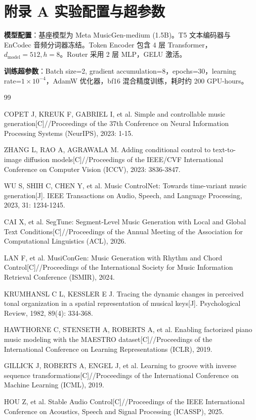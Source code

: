 \documentclass[twocolumn, a4paper, 10pt]{ctexart}
\begin{document}
\section*{附录 A \quad 实验配置与超参数}

\textbf{模型配置}：基座模型为 Meta MusicGen-medium (1.5B)。T5 文本编码器与 EnCodec 音频分词器冻结。Token Encoder 包含 4 层 Transformer，$d_{\text{model}} = 512, h = 8$。Router 采用 2 层 MLP，GELU 激活。

\textbf{训练超参数}：Batch size=2, gradient accumulation=8，epochs=30，learning rate=$1 \times 10^{-4}$，AdamW 优化器，bf16 混合精度训练，耗时约 200 GPU-hours。

\renewcommand\refname{参考文献}
\begin{thebibliography}{99}

COPET J, KREUK F, GABRIEL I, et al. Simple and controllable music generation[C]//Proceedings of the 37th Conference on Neural Information Processing Systems (NeurIPS), 2023: 1-15.

ZHANG L, RAO A, AGRAWALA M. Adding conditional control to text-to-image diffusion models[C]//Proceedings of the IEEE/CVF International Conference on Computer Vision (ICCV), 2023: 3836-3847.

WU S, SHIH C, CHEN Y, et al. Music ControlNet: Towards time-variant music generation[J]. IEEE Transactions on Audio, Speech, and Language Processing, 2023, 31: 1234-1245.

CAI X, et al. SegTune: Segment-Level Music Generation with Local and Global Text Conditions[C]//Proceedings of the Annual Meeting of the Association for Computational Linguistics (ACL), 2026.

LAN F, et al. MusiConGen: Music Generation with Rhythm and Chord Control[C]//Proceedings of the International Society for Music Information Retrieval Conference (ISMIR), 2024.

KRUMHANSL C L, KESSLER E J. Tracing the dynamic changes in perceived tonal organization in a spatial representation of musical keys[J]. Psychological Review, 1982, 89(4): 334-368.

HAWTHORNE C, STENSETH A, ROBERTS A, et al. Enabling factorized piano music modeling with the MAESTRO dataset[C]//Proceedings of the International Conference on Learning Representations (ICLR), 2019.

GILLICK J, ROBERTS A, ENGEL J, et al. Learning to groove with inverse sequence transformations[C]//Proceedings of the International Conference on Machine Learning (ICML), 2019.

HOU Z, et al. Stable Audio Control[C]//Proceedings of the IEEE International Conference on Acoustics, Speech and Signal Processing (ICASSP), 2025.

\end{thebibliography}
\end{document}
